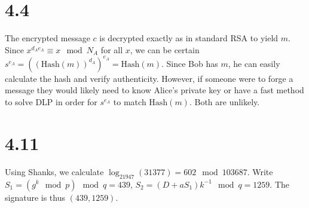 \documentclass{article}
\begin{document}
\section*{4.4}
The encrypted message $c$ is decrypted exactly as in standard RSA to yield $m$. Since $x^{d_Ae_A} \equiv x \mod N_A$ for all $x$, we can be certain $s^{e_A} = ((\mathrm{Hash}(m))^{d_A})^{e_A} = \mathrm{Hash}(m)$. Since Bob has $m$, he can easily calculate the hash and verify authenticity. However, if someone were to forge a message they would likely need to know Alice's private key or have a fast method to solve DLP in order for $s^{e_A}$ to match $\mathrm{Hash}(m)$. Both are unlikely.

\section*{4.11}
Using Shanks, we calculate $\log_{21947}(31377) = 602 \!\!\!\mod 103687$. Write $S_1 = (g^k \!\!\!\mod p)\!\!\!\mod q = 439$, $S_2 = (D+aS_1)k^{-1} \!\!\!\mod q = 1259$. The signature is thus $(439,1259)$.
\end{document}
